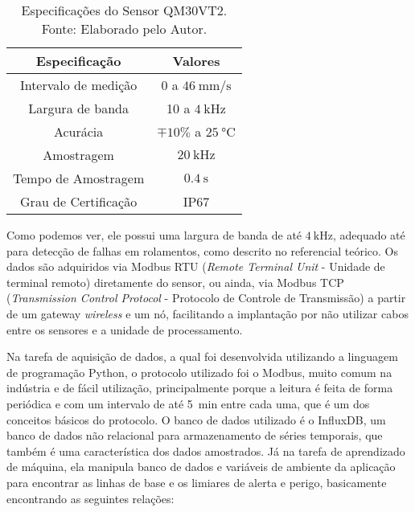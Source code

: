 \documentclass[a4paper]{ifacconf}
\begin{document}
\begin{table}[H]
  \caption{Especificações do Sensor QM30VT2. Fonte: Elaborado pelo Autor.}
  \label{tab:espec_sensor}
  \centering
  \begin{minipage}{.33\textwidth}
    \begin{tabular*}{\textwidth}{c|c}
      \hline
      Especificação            & Valores                                     \\ \hline
      \hline
      Intervalo de medição     &  0 a $\SI{46}{\milli\metre\per\second}$     \\
      Largura de banda         &  10 a $\SI{4}{\kilo\hertz}$                 \\ 
      Acurácia                 &  $\mp 10 \%$ a $\SI{25}{\celsius}$          \\
      Amostragem               &  $\SI{20}{\kilo\hertz}$                     \\
      Tempo de Amostragem      &  $\SI{0.4}{\second}$                        \\
      Grau de Certificação     &  IP67                                       \\ \hline
    \end{tabular*}
  \end{minipage}
\end{table}

Como podemos ver, ele possui uma largura de banda de até $\SI{4}{\kilo\hertz}$, adequado até para detecção de falhas em rolamentos, como 
descrito no referencial teórico. Os dados são adquiridos via Modbus RTU (\textit{Remote Terminal Unit} - Unidade de terminal remoto) diretamente
do sensor, ou ainda, via Modbus TCP (\textit{Transmission Control Protocol} - Protocolo de Controle de Transmissão) a partir de um gateway
\textit{wireless} e um nó, facilitando a implantação por não utilizar cabos entre os sensores e a unidade de processamento. 

Na tarefa de aquisição de dados, a qual foi desenvolvida utilizando a linguagem de programação Python, o protocolo utilizado foi o Modbus, 
muito comum na indústria e de fácil utilização, principalmente porque a leitura é feita de forma periódica e com um intervalo de até 
\SI{5}{\minute} entre cada uma, que é um dos conceitos básicos do protocolo. O banco de dados utilizado é o InfluxDB, um banco de dados não 
relacional para armazenamento de séries temporais, que também é uma característica dos dados amostrados.
Já na tarefa de aprendizado de máquina, ela  manipula banco de dados e variáveis de ambiente da aplicação para encontrar as linhas de base e
os limiares de alerta e perigo, basicamente encontrando as seguintes relações:
\end{document}
